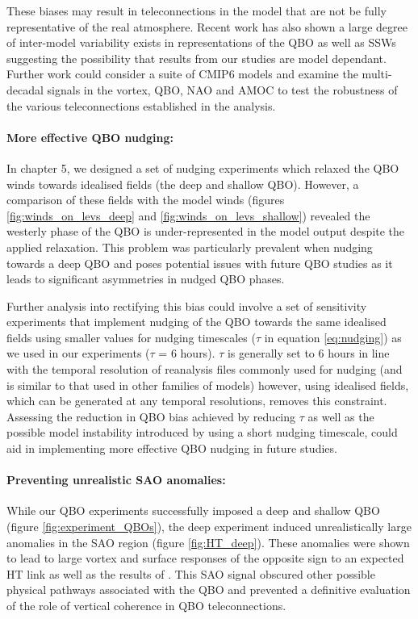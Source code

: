These biases may result in teleconnections in the model that are not be fully representative of the real atmosphere. Recent work has also shown a large degree of inter-model variability exists in representations of the QBO \citep{bushellEvaluation2020b} as well as SSWs \citep{ayarzaguenaUncertainty2020b} suggesting the possibility that results from our studies are model dependant. Further work could consider a suite of CMIP6 models and examine the multi-decadal signals in the vortex, QBO, NAO and AMOC to test the robustness of the various teleconnections established in the analysis.   

\paragraph{More effective QBO nudging:}
In chapter 5, we designed a set of nudging experiments which relaxed the QBO winds towards idealised fields (the deep and shallow QBO). However, a comparison of these fields with the model winds (figures \ref{fig:winds_on_levs_deep} and \ref{fig:winds_on_levs_shallow}) revealed the westerly phase of the QBO is under-represented in the model output despite the applied relaxation. This problem was particularly prevalent when nudging towards a deep QBO and poses potential issues with future QBO studies as it leads to significant asymmetries in nudged QBO phases.

Further analysis into rectifying this bias could involve a set of sensitivity experiments that implement nudging of the QBO towards the same idealised fields using smaller values for nudging timescales ($\tau$ in equation \ref{eq:nudging}) as we used in our experiments ($\tau$ = 6 hours). $\tau$ is generally set to 6 hours in line with the temporal resolution of reanalysis files commonly used for nudging (and is similar to that used in other families of models) \citep{telfordTechnical2008} however, using idealised fields, which can be generated at any temporal resolutions, removes this constraint. Assessing the reduction in QBO bias achieved by reducing $\tau$ as well as the possible model instability introduced by using a short nudging timescale, could aid in implementing more effective QBO nudging in future studies.

\paragraph{Preventing unrealistic SAO anomalies:}
While our QBO experiments successfully imposed a deep and shallow QBO (figure \ref{fig:experiment_QBOs}), the deep experiment induced unrealistically large anomalies in the SAO region (figure \ref{fig:HT_deep}). These anomalies were shown to lead to large vortex and surface responses of the opposite sign to an expected HT link as well as the results of \cite{andrewsObserved2019d}. This SAO signal obscured other possible physical pathways associated with the QBO and prevented a definitive evaluation of the role of vertical coherence in QBO teleconnections. 

